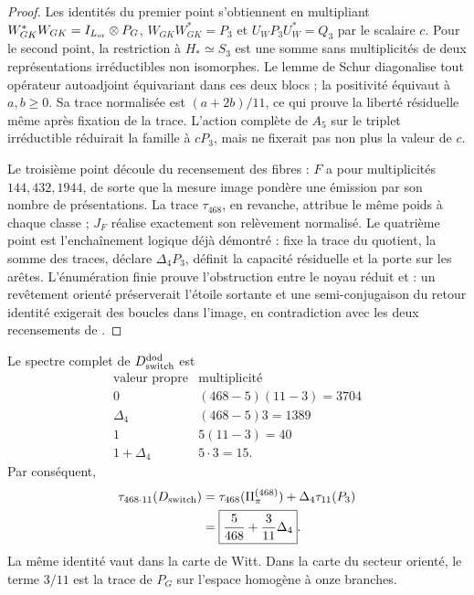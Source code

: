 \begin{proof}
Les identités du premier point s’obtiennent en multipliant
\(W_{GK}^{*}W_{GK}=I_{L_{\rm or}}\otimes P_G\),
\(W_{GK}W_{GK}^{*}=P_3\) et \(U_WP_3U_W^{*}=Q_3\) par le scalaire \(c\).
Pour le second point, la restriction à \(H_*\simeq S_3\) est une somme sans
multiplicités de deux représentations irréductibles non isomorphes. Le lemme de
Schur diagonalise tout opérateur autoadjoint équivariant dans ces deux blocs ;
la positivité équivaut à \(a,b\geq0\). Sa trace normalisée est
\((a+2b)/11\), ce qui prouve la liberté résiduelle même après fixation de la
trace. L’action complète de \(A_5\) sur le triplet irréductible réduirait
la famille à \(cP_3\), mais ne fixerait pas non plus la valeur de \(c\).

Le troisième point découle du recensement des fibres : \(F\) a pour multiplicités
\(144,432,1944\), de sorte que la mesure image pondère une émission par son
nombre de présentations. La trace \(\tau_{468}\), en revanche, attribue le
même poids à chaque classe ; \(J_F\) réalise exactement son relèvement
normalisé. Le quatrième point est l’enchaînement logique déjà démontré :
\HTr fixe la trace du quotient, \HAdd la somme des traces, \HDef déclare
\(\Delta_4P_3\), \HRes définit la capacité résiduelle et \HLoc la porte sur les arêtes.
L’énumération finie prouve l’obstruction entre le noyau réduit et
\Gtr : un revêtement orienté préserverait l’étoile sortante et une
semi-conjugaison du retour identité exigerait des boucles dans l’image,
en contradiction avec les deux recensements de \Gtr.
\end{proof}

Le spectre complet de \(D_{\rm switch}^{\rm dod}\) est
\[
\begin{array}{c|c}
\text{valeur propre}&\text{multiplicité}\\ \hline
0&(468-5)(11-3)=3704\\
\Delta_4&(468-5)3=1389\\
1&5(11-3)=40\\
1+\Delta_4&5\cdot3=15.
\end{array}
\]
Par conséquent,
\[
\begin{aligned}
 \tau_{468\cdot11}(D_{\rm switch})
 &=\tau_{468}(\Pi_\pi^{(468)})+\Delta_4\tau_{11}(P_3)\\
 &=\boxed{\frac5{468}+\frac3{11}\Delta_4}.
\end{aligned}
\]
La même identité vaut dans la carte de Witt. Dans la carte du secteur orienté, le terme
\(3/11\) est la trace de \(P_G\) sur l’espace homogène à onze branches.

